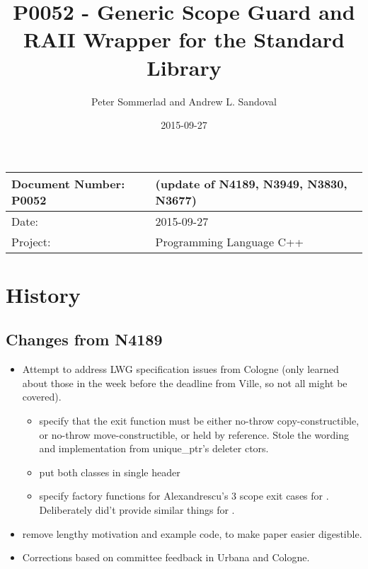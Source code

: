 \documentclass[ebook,11pt,article]{memoir}
\title{P0052 - Generic Scope Guard and RAII Wrapper for the Standard Library}
\author{Peter Sommerlad and Andrew L. Sandoval}
\date{2015-09-27}                                           %
\begin{document}
\maketitle
\begin{tabular}[t]{|l|l|}\hline 
Document Number: P0052 &   (update of N4189, N3949, N3830, N3677)\\\hline
Date: & 2015-09-27 \\\hline
Project: & Programming Language C++\\\hline 
\end{tabular}

\chapter{History}
\section{Changes from N4189}
\begin{itemize}
\item Attempt to address LWG specification issues from Cologne (only learned about those in the week before the deadline from Ville, so not all might be covered).
\begin{itemize}
\item specify that the exit function must be either no-throw copy-constructible, or no-throw move-constructible, or held by reference. Stole the wording and implementation from unique_ptr's deleter ctors.
\item put both classes in single header 
\item specify factory functions for Alexandrescu's 3 scope exit cases for . Deliberately did't provide similar things for .
\end{itemize}
\item remove lengthy motivation and example code, to make paper easier digestible.
\item Corrections based on committee feedback in Urbana and Cologne.
\end{itemize}

\end{document}
